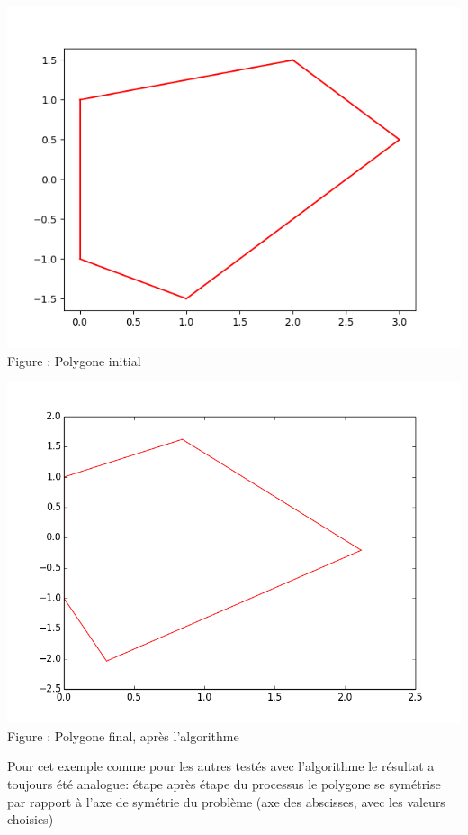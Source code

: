 \documentclass[a4paper,reqno]{article}
\begin{document}
\begin{center}
\includegraphics[scale=0.5]{initialPolygon.png}
\\ Figure : Polygone initial
\end{center}

\begin{center}
\includegraphics[scale=0.4]{finale.png}
\\ Figure : Polygone final, après l'algorithme 
\end{center}

Pour cet exemple comme pour les autres testés avec l'algorithme le résultat a toujours été analogue: étape après étape du processus le polygone se symétrise par rapport à l'axe de symétrie du problème (axe des abscisses, avec les valeurs choisies)
\end{document}
